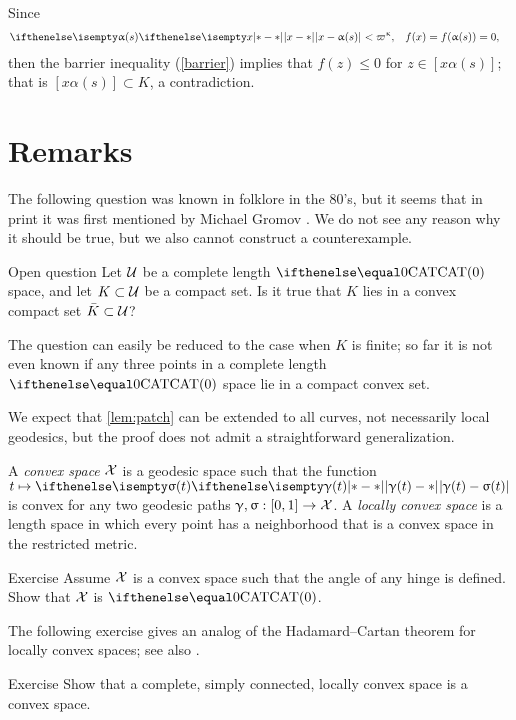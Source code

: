 Since 
\begin{align*}
\dist{x}{\alpha(s)}{}&<\varpi\kappa,
&
f(x)&=f(\alpha(s))=0,
\end{align*}
then the barrier inequality (\ref{barrier}) 
implies that $f(z)\le 0$ for $z\in [x\alpha(s)]$;
that is $[x\alpha(s)]\subset K$, a contradiction.
\qeds

\section{Remarks}

The following question was known in folklore in the 80's,
but it seems that in print
it was first mentioned by Michael Gromov \cite[6.B$_1\mathrm{(f)}$]{gromov:asymt-inv}.
We do not see any reason why it should be true, 
but we also cannot construct a counterexample.

\begin{thm}{Open question}
Let $\mathcal{U}$ be a complete length $\CAT0$ space, and let $K\subset \spc{U}$ be a compact set.
Is it true that $K$ lies in a convex compact set $\bar K\subset\spc{U}$?
\end{thm}

The question can  easily be reduced to the case when $K$ is finite;
so far it is not even known if any three points in a complete length $\CAT0$ space lie in a compact convex set.

We expect that \ref{lem:patch} can be extended to all curves, not necessarily local geodesics,
but the proof does not admit a straightforward generalization.

A \emph{convex space} $\mathcal{X}$ is a geodesic space such that the function
$t\mapsto\dist{\gamma(t)}{\sigma(t)}{}$ is convex 
for any two  geodesic paths $\gamma,\sigma:[0,1]\to \spc{X}$.  
A \emph{locally convex space} is a length space in which every point has a neighborhood that is a convex space in the restricted metric.

\begin{thm}{Exercise}\label{ex:cats-cradle}
Assume $\mathcal{X}$ is a convex space 
such that the angle of any hinge is defined.
Show that $\mathcal{X}$ is $\CAT{0}$.
\end{thm}

The following exercise gives an analog of the Hadamard--Cartan theorem for locally convex spaces;
see also \cite{alexander-bishop:h-c}.

\begin{thm}{Exercise}\label{ex:Hadamard--Cartan}
Show that a complete, simply connected, locally convex space is a convex space.
\end{thm}

